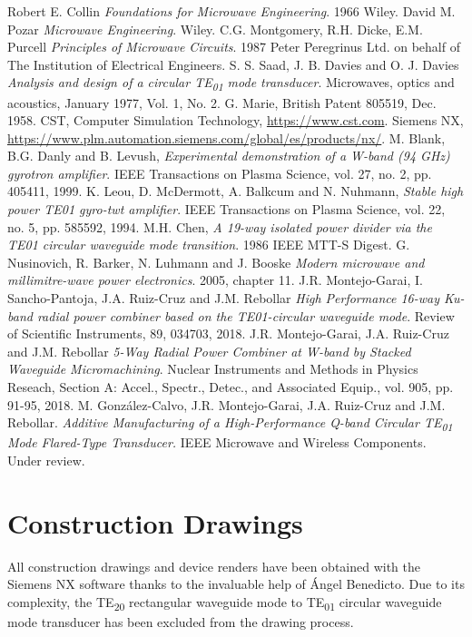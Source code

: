 \documentclass[english,twoside]{article}
\begin{document}
	\newpage
	\begin{thebibliography}{XX}
		 Robert E. Collin \textit{Foundations for Microwave Engineering}. 1966 Wiley.
		 David M. Pozar \textit{Microwave Engineering}. Wiley. 
		 C.G. Montgomery, R.H. Dicke, E.M. Purcell \textit{Principles of Microwave Circuits}. 1987 Peter Peregrinus Ltd. on behalf of The Institution of Electrical Engineers.
		 S. S. Saad, J. B. Davies and O. J. Davies \textit{Analysis and design of a circular TE\textsubscript{01} mode transducer}. Microwaves, optics and acoustics, January 1977, Vol. 1, No. 2.
		 G. Marie, British Patent 805519, Dec. 1958.
		 CST, Computer Simulation Technology, \url{https://www.cst.com}.
		 Siemens NX, \url{https://www.plm.automation.siemens.com/global/es/products/nx/}.
		 M. Blank, B.G. Danly and B. Levush, \textit{Experimental demonstration of a W-band (94 GHz) gyrotron amplifier}. IEEE Transactions on Plasma Science, vol. 27, no. 2, pp. 405411, 1999.
		 K. Leou, D. McDermott, A. Balkcum and N. Nuhmann, \textit{Stable high power TE01 gyro-twt amplifier}. IEEE Transactions on Plasma Science, vol. 22, no. 5, pp. 585592, 1994.
		 M.H. Chen, \textit{A 19-way isolated power divider via the TE01 circular waveguide mode transition}. 1986 IEEE MTT-S Digest.
		 G. Nusinovich, R. Barker, N. Luhmann and J. Booske \textit{Modern microwave and millimitre-wave power electronics}. 2005, chapter 11.
		 J.R. Montejo-Garai, I. Sancho-Pantoja, J.A. Ruiz-Cruz and J.M. Rebollar \textit{High Performance 16-way Ku-band radial power combiner based on the TE01-circular waveguide mode}. Review of Scientific Instruments, 89, 034703, 2018.
		 J.R. Montejo-Garai, J.A. Ruiz-Cruz and J.M. Rebollar \textit{5-Way Radial Power Combiner at W-band by Stacked Waveguide Micromachining}. Nuclear Instruments and Methods in Physics Reseach, Section A: Accel., Spectr., Detec., and Associated Equip., vol. 905, pp. 91-95, 2018.
		 M. González-Calvo, J.R. Montejo-Garai, J.A. Ruiz-Cruz and J.M. Rebollar. \textit{Additive Manufacturing of a High-Performance Q-band Circular TE\textsubscript{01} Mode Flared-Type Transducer.} IEEE Microwave and Wireless Components. Under review.
	\end{thebibliography}
	
	\appendix
	\newpage
	\section{Construction Drawings}
		All construction drawings and device renders have been obtained with the Siemens NX software \cite{nx} thanks to the invaluable help of Ángel Benedicto. Due to its complexity, the \ac{TE}\textsubscript{20} rectangular waveguide mode to \ac{TE}\textsubscript{01} circular waveguide mode transducer has been excluded from the drawing process.
	
\end{document}
